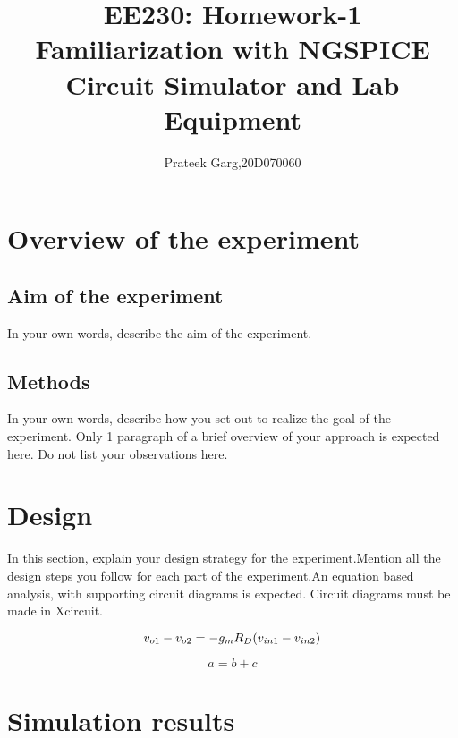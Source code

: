 \documentclass[12pt]{article}
\title{EE230: Homework-1\\
Familiarization with NGSPICE Circuit Simulator and Lab Equipment}
\author{Prateek Garg,20D070060}
\begin{document}
\maketitle

\section{Overview of the experiment} %

\subsection{Aim of the experiment}%

In your own words, describe the aim of the experiment.

\subsection{Methods}

In your own words, describe how you set out to realize the goal of the experiment. Only 1 paragraph of a brief overview of your approach is expected here. Do not list your observations here.

\section{Design}%

In this section, explain your design strategy for the experiment.Mention all the design steps you follow for each part of the experiment.An equation based analysis, with supporting circuit diagrams is expected. Circuit diagrams must be made in Xcircuit.
 
 \begin{equation}
     v_{o1}-v_{o2}
     \newline
     = -g_mR_D(v_{in1}-v_{in2})
 \end{equation}     
 
 \begin{equation}
     a=b+c
 \end{equation}     



\section{Simulation results}%
\end{document}
